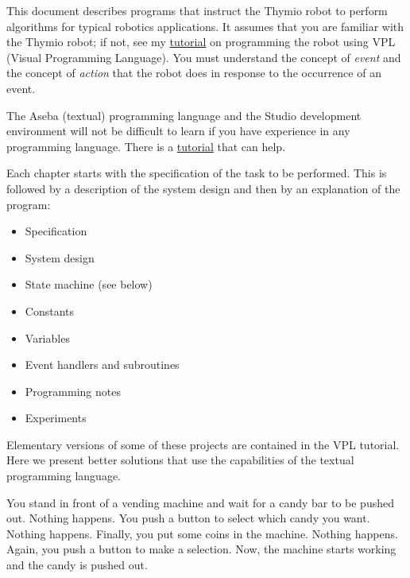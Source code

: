 
\label{ch.intro}

This document describes programs that instruct the Thymio robot to
perform algorithms for typical robotics applications. It assumes that
you are familiar with the Thymio robot; if not, see my
\href{https://aseba.wdfiles.com/local--files/en:thymioprogram/thymio-vpl-tutorial-en.zip}{tutorial}
on programming the robot using VPL (Visual Programming Language).
You must understand the concept of \emph{event} and the concept of
\emph{action} that the robot does in response to the occurrence of an
event.

The Aseba (textual) programming language and the Studio development
environment will not be difficult to learn if you have experience in any
programming language. There is a
\href{https://aseba.wikidot.com/en:thymiotutoriel}{tutorial} that can
help.


Each chapter starts with the specification of the task to be performed.
This is followed by a description of the system design and then by an
explanation of the program:

\begin{itemize}
\item Specification
\item System design
\item State machine (see below)
\item Constants
\item Variables
\item Event handlers and subroutines
\item Programming notes
\item Experiments
\end{itemize}


\newpage


Elementary versions of some of these projects are contained in the VPL
tutorial. Here we present better solutions that use the capabilities of
the textual programming language.


You stand in front of a vending machine and wait for a candy bar to be
pushed out. Nothing happens. You push a button to select which candy you
want. Nothing happens. Finally, you put some coins in the machine.
Nothing happens. Again, you push a button to make a selection. Now, the
machine starts working and the candy is pushed out.

